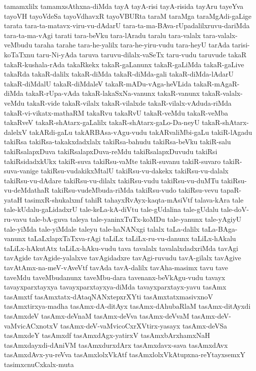 {tamamxlilx
tamamxsAthxna-diMda
tayA
tayA-risi
tayA-risida
tayAru
tayeYva
tayoVH
tayoVdeSa
tayoVdhavxR
tayoVBURta
taraM
taraMga
taraMgAdi-gaLige
tarata
tara-ta-matavx-viru-vu-dAdarU
tara-ta-ma-BAva-rUpadalilxruvu-dariMda
tara-ta-ma-vAgi
tarati
tara-beVku
tara-lAradu
taralu
tara-valalx
tara-valalx-veMbudu
taraha
tarahe
tara-he-yalilx
tara-he-yiru-vudu
tara-heyU
tarAda
tarisi-koTaTxnu
taru-Ni-yAda
taruva
taruvu-dilalx-vaSeTx
taru-vudu
taruvude
takaR
takaR-kushala-rAda
takaRkekx
takaR-gaLanunx
takaR-gaLiMda
takaR-gaLive
takaRda
takaR-dalilx
takaR-diMda
takaR-diMda-gali
takaR-diMda-lAdarU
takaR-diMdalU
takaR-diMdaleV
takaR-mADu-vAga-heVLida
takaR-mAgaR-diMda
takaR-rUpa-vAda
takaR-lakaSxNa-vanunx
takaR-vanunx
takaR-valalx-veMdu
takaR-vide
takaR-vilalx
takaR-vilalxde
takaR-vilalx-vAduda-riMda
takaR-vi-vikatx-mathaRM
takaRvu
takaRvU
takaR-veMdu
takaR-veMba
takaRveV
takaR-shAtarx-gaLalilx
takaR-shAtarx-gaLo-Da-neyU
takaR-shAtarx-dalelxV
takARdi-gaLu
takARBAsa-vAgu-vudu
takARvaliMbi-gaLu
takiR-lAgadu
takiRsa
takiRsa-takakxdadxlalx
takiRsa-bahudu
takiRsa-beVku
takiR-salu
takiRsalapxDuva
takiRsalapxDuva-reMdu
takiRsalapxDuvudu
takiRsi
takiRsidadxkUkx
takiR-suva
takiRsu-vaMte
takiR-suvanu
takiR-suvaro
takiR-suva-vanige
takiRsu-vudakikxMtalU
takiRsu-vu-dakekx
takiRsu-vu-dalalx
takiRsu-vu-dAdare
takiRsu-vu-dilalx
takiRsu-vudu
takiRsu-vu-duMTu
takiRsu-vu-deMdathaR
takiRsu-vudeMbuda-riMda
takiRsu-vudo
takiRsu-vevu
tapaR-yataH
tasimxR-shukalxmf
tahiR
tahayxRvAyx-kaqta-mAsiVtf
talava-kAra
tale
tale-kUdalu-gaLidadxrU
tale-keLa-kA-diVtu
tale-gUdalina
tale-gUdalu
tale-doV-ru-vavu
tale-bA-guva
taleya
tale-yaninxTuTx-koMDu
tale-yanunx
tale-yAgiyU
tale-yiMda
tale-yiMdale
taleyu
tale-haNANxgi
talalx
taLa-dalilx
taLa-BAga-vanunx
taLaLxlapxTaTxva-rAgi
taLiLx
taLiLx-ru-vu-danunx
taLiLx-hAkalu
taLiLx-hAkutAtx
taLiLx-hAku-vudu
tava
tavalalx
tavalalxdadxriMda
tavAgi
tavAgide
tavAgide-yalalxve
tavAgidadxre
tavAgi-ruvudu
tavA-gilalx
tavAgive
tavAtAmx-na-meV-vAveVtf
tavAda
tavA-dalilx
tavAha-masimx
tavu
tave
taveMdu
taveMbudanunx
taveMbu-dara
tavenanx-beVkAgu-vudu
tavayx
tavayxparxtayxya
tavayxparxtayxya-diMda
tavayxparxtayx-yavu
tasAmx
tasAmxtf
tasAmxtatx-dAtaqNANxtepxrXYti
tasAmxtatxmasivxnoV
tasAmxtirxya-madha
tasAmx-dA-ditAyx
tasAmx-dAhubaRlaM
tasAmx-ditAyxdi
tasAmxdeV
tasAmx-deVnaM
tasAmx-deVva
tasAmx-deVvaM
tasAmx-deV-vaMvicACxnotxV
tasAmx-deV-vaMvicoCxrXVtirx-yasayx
tasAmx-deVSa
tasAmxdeY
tasAmxdf
tasAmxdAgx-yatirxV
tasAmxbArxhamxNaH
tasAmxdayxdi-dAniVM
tasAmxdurxdArx
tasAmxdavx-sava
tasAmxdAvx
tasAmxdAvx-yu-reVva
tasAmxlolxVkAtf
tasAmxlolxVkAtupxna-reYtayxsemxY
tasimxcnuCxkalx-muta
}
